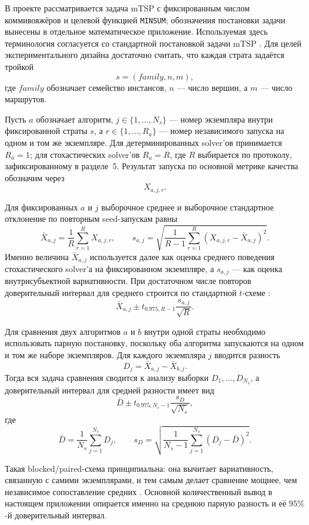 \begin{refsection}
В проекте рассматривается задача mTSP с фиксированным числом коммивояжёров и целевой функцией \texttt{MINSUM}; обозначения постановки задачи вынесены в отдельное математическое приложение. Используемая здесь терминология согласуется со стандартной постановкой задачи mTSP \cite{bektas2006}. Для целей экспериментального дизайна достаточно считать, что каждая страта задаётся тройкой
\[
s = (family, n, m),
\]
где \(family\) обозначает семейство инстансов, \(n\) --- число вершин, а \(m\) --- число маршрутов.

Пусть \(a\) обозначает алгоритм, \(j \in \{1,\dots,N_s\}\) --- номер экземпляра внутри фиксированной страты \(s\), а \(r \in \{1,\dots,R_a\}\) --- номер независимого запуска на одном и том же экземпляре. Для детерминированных solver'ов принимается \(R_a = 1\); для стохастических solver'ов \(R_a = R\), где \(R\) выбирается по протоколу, зафиксированному в разделе~5. Результат запуска по основной метрике качества обозначим через
\[
X_{a,j,r}.
\]

Для фиксированных \(a\) и \(j\) выборочное среднее и выборочное стандартное отклонение по повторным seed-запускам равны
\[
\bar X_{a,j} = \frac{1}{R}\sum_{r=1}^{R} X_{a,j,r},
\qquad
s_{a,j} = \sqrt{\frac{1}{R-1}\sum_{r=1}^{R}\left(X_{a,j,r}-\bar X_{a,j}\right)^2}.
\]
Именно величина \(\bar X_{a,j}\) используется далее как оценка среднего поведения стохастического solver'а на фиксированном экземпляре, а \(s_{a,j}\) --- как оценка внутрисубъектной вариативности. При достаточном числе повторов доверительный интервал для среднего строится по стандартной \(t\)-схеме \cite{nistNormal,nistMeanCI}:
\[
\bar X_{a,j} \pm t_{0.975,R-1}\frac{s_{a,j}}{\sqrt{R}}.
\]

Для сравнения двух алгоритмов \(a\) и \(b\) внутри одной страты необходимо использовать парную постановку, поскольку оба алгоритма запускаются на одном и том же наборе экземпляров. Для каждого экземпляра \(j\) вводится разность
\[
D_j = \bar X_{a,j} - \bar X_{b,j}.
\]
Тогда вся задача сравнения сводится к анализу выборки \(D_1,\dots,D_{N_s}\), а доверительный интервал для средней разности имеет вид \cite{psuPaired,nistMeanCI}
\[
\bar D \pm t_{0.975,N_s-1}\frac{s_D}{\sqrt{N_s}},
\]
где
\[
\bar D = \frac{1}{N_s}\sum_{j=1}^{N_s} D_j,
\qquad
s_D = \sqrt{\frac{1}{N_s-1}\sum_{j=1}^{N_s}(D_j - \bar D)^2}.
\]

Такая blocked/paired-схема принципиальна: она вычитает вариативность, связанную с самими экземплярами, и тем самым делает сравнение мощнее, чем независимое сопоставление средних \cite{psuPaired,johnson1999}. Основной количественный вывод в настоящем приложении опирается именно на среднюю парную разность и её \(95\%\)-й доверительный интервал.


\end{refsection}
